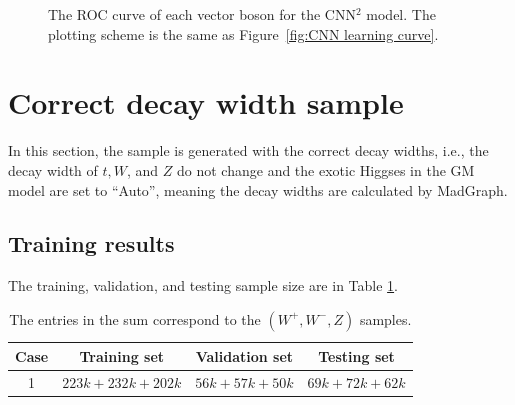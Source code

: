 \documentclass[12pt]{article}
\begin{document}
		\begin{figure}[htpb]
			\centering
			\caption{The ROC curve of each vector boson for the CNN$^2$ model. The plotting scheme is the same as Figure~\ref{fig:CNN learning curve}.}
			\label{fig:CNNsq roc curve}
		\end{figure}

\section{Correct decay width sample}%
\label{sec:correct_decay_width_sample}
	In this section, the sample is generated with the correct decay widths, i.e., the decay width of $t, W$, and $Z$ do not change and the exotic Higgses in the GM model are set to ``Auto'', meaning the decay widths are calculated by MadGraph.

	\subsection{Training results}%
	\label{sub:training_results_correct_decay_width}
		The training, validation, and testing sample size are in Table \ref{tab:sample_size_correct_decay_width}.
		\begin{table}[htpb]
			\centering
			\caption{The entries in the sum correspond to the $(W^{+}, W^{-}, Z)$ samples.}
			\label{tab:sample_size_correct_decay_width}
			\begin{tabular}{c|c|c|c}
			Case & Training set     & Validation set & Testing set   \\ \hline
			1    & $223k+232k+202k$ & $56k+57k+50k$ & $69k+72k+62k$\\
			\end{tabular}
		\end{table}
\end{document}
